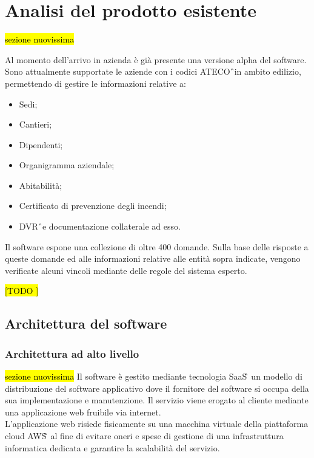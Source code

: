 
\section{Analisi del prodotto esistente}
\hl{sezione nuovissima}

Al momento dell'arrivo in azienda è già presente una versione alpha del software. \\
Sono attualmente supportate le aziende con i codici \gls{ATECO}\G\ in ambito edilizio, permettendo di gestire le informazioni relative a:
\begin{itemize}
	\item Sedi;
	\item Cantieri;
	\item Dipendenti;
	\item Organigramma aziendale;
	\item Abitabilità;
	\item Certificato di prevenzione degli incendi;
	\item \gls{DVR}\G\ e documentazione collaterale ad esso.
\end{itemize}
Il software espone una collezione di oltre 400 domande. Sulla base delle risposte a queste domande ed alle informazioni relative alle entità sopra indicate, vengono verificate alcuni vincoli mediante delle regole del sistema esperto.


\hl{[TODO ]}

\subsection{Architettura del software}
\subsubsection{Architettura ad alto livello}
\hl{sezione nuovissima}
Il software è gestito mediante tecnologia \gls{SaaS}\G\, un modello di distribuzione del software applicativo dove il fornitore del software si occupa della sua implementazione e manutenzione. Il servizio viene erogato al cliente mediante una applicazione web fruibile via internet. \\ 
L'applicazione web risiede fisicamente su una macchina virtuale della piattaforma cloud \gls{AWS}\G\, al fine di evitare oneri e spese di gestione di una infrastruttura informatica dedicata e garantire la scalabilità del servizio.\\

